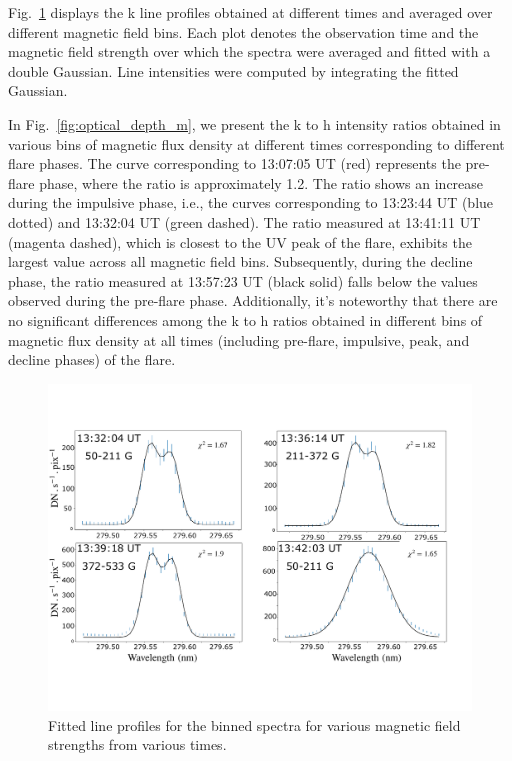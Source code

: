 Fig.~\ref{fig:fit_pix_fov} displays the   k line profiles obtained at different times and averaged over different magnetic field bins. Each plot denotes the observation time and the magnetic field strength over which the spectra were averaged and fitted with a double Gaussian. Line intensities were computed by integrating the fitted Gaussian.

In Fig.~\ref{fig:optical_depth_m}, we present the k to h intensity ratios obtained in various bins of magnetic flux density at different times corresponding to different flare phases. The curve corresponding to 13:07:05 UT (red) represents the pre-flare phase, where the ratio is approximately 1.2. The ratio shows an increase during the impulsive phase, i.e., the curves corresponding to 13:23:44 UT (blue dotted) and 13:32:04 UT (green dashed). The ratio measured at 13:41:11 UT (magenta dashed), which is closest to the UV peak of the flare, exhibits the largest value across all magnetic field bins. Subsequently, during the decline phase, the ratio measured at 13:57:23 UT (black solid) falls below the values observed during the pre-flare phase. Additionally, it's noteworthy that there are no significant differences among the k to h ratios obtained in different bins of magnetic flux density at all times (including pre-flare, impulsive, peak, and decline phases) of the flare.

\begin{figure}[ht!]
    \begin{center}
    \includegraphics[trim={0cm 3cm 0cm 3cm},clip,width=\textwidth]{Figures/binned_fit_fov.pdf}
    \end{center}
    \caption{Fitted line profiles for the binned spectra for various magnetic field strengths from various times.}
    \label{fig:fit_pix_fov}
\end{figure}

